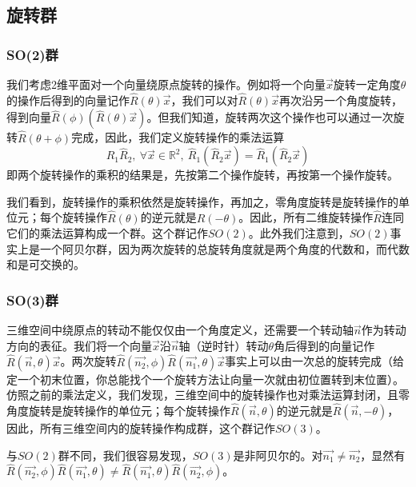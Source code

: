 \documentclass[a4paper,11pt]{ctexart}
\newcommand{\beq}{\begin{equation}}
\newcommand{\eeq}{\end{equation}}
\newcommand{\reals}{\mathbb{R}}
\begin{document}
\subsection{旋转群}
\subsubsection{SO(2)群}
我们考虑2维平面对一个向量绕原点旋转的操作。例如将一个向量$\vec{x}$旋转一定角度$\theta$的操作后得到的向量记作$\hat{R}(\theta) \vec{x}$，我们可以对$\hat{R}(\theta) \vec{x}$再次沿另一个角度旋转，得到向量$\hat{R}(\phi) (\hat{R}(\theta) \vec{x})$。但我们知道，旋转两次这个操作也可以通过一次旋转$\hat{R}(\theta + \phi)$完成，因此，我们定义旋转操作的乘法运算
\beq
\hat{R}_1 \hat{R}_2, \ \forall \vec{x}\in \reals^2,\ \hat{R}_1 (\hat{R}_2 \vec{x}) = \hat{R}_1 (\hat{R}_2 \vec{x})
\eeq
即两个旋转操作的乘积的结果是，先按第二个操作旋转，再按第一个操作旋转。
\par
我们看到，旋转操作的乘积依然是旋转操作，再加之，零角度旋转是旋转操作的单位元；每个旋转操作$\hat{R}(\theta)$的逆元就是$\hat{R}(-\theta)$。因此，所有二维旋转操作$\hat{R}$连同它们的乘法运算构成一个群。这个群记作$SO(2)$。此外我们注意到，$SO(2)$事实上是一个阿贝尔群，因为两次旋转的总旋转角度就是两个角度的代数和，而代数和是可交换的。
\subsubsection{SO(3)群}
三维空间中绕原点的转动不能仅仅由一个角度定义，还需要一个转动轴$\vec{n}$作为转动方向的表征。我们将一个向量$\vec{x}$沿$\vec{n}$轴（逆时针）转动$\theta$角后得到的向量记作$\hat{R}(\vec{n},\theta) \vec{x}$。两次旋转$\hat{R}(\vec{n_2},\phi) \hat{R}(\vec{n_1},\theta) \vec{x}$事实上可以由一次总的旋转完成（给定一个初末位置，你总能找个一个旋转方法让向量一次就由初位置转到末位置）。仿照之前的乘法定义，我们发现，三维空间中的旋转操作也对乘法运算封闭，且零角度旋转是旋转操作的单位元；每个旋转操作$\hat{R}(\vec{n},\theta)$的逆元就是$\hat{R}(\vec{n},-\theta)$，因此，所有三维空间内的旋转操作构成群，这个群记作$SO(3)$。\par
与$SO(2)$群不同，我们很容易发现，$SO(3)$是非阿贝尔的。对$\vec{n_1} \not= \vec{n_2}$，显然有$\hat{R}(\vec{n_2},\phi) \hat{R}(\vec{n_1},\theta) \not=  \hat{R}(\vec{n_1},\theta) \hat{R}(\vec{n_2},\phi)$。
\end{document}
